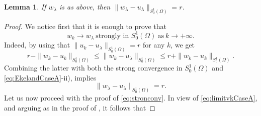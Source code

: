 \documentclass[11pt]{amsart}
\numberwithin{equation}{section} %
\newtheorem{lemma}[teo]{Lemma}
\theoremstyle{definition}
\newcommand{\m}{\mbox}
\begin{document}
\begin{lemma}\label{lem:casoa2}
	If $w_\lambda$ is as above,
	then $\|w_\lambda-u_\lambda\|_{S^{1}_{0}(\Omega)}=r$.
\end{lemma}
\begin{proof} 
We notice first that it is enough to prove that 
\begin{equation}\label{eq:stronconv}
	w_k\to w_\lambda\ \m{strongly in }S_0^1(\Omega)\ \m{as}\ k\to+\infty.
\end{equation}
Indeed, by using that $\|u_k-u_\lambda\|_{S^{1}_{0}(\Omega)}=r$ for any $k$,
we get
\[
r-\|w_k-u_k\|_{S^{1}_{0}(\Omega)} \leq \|w_k-u_\lambda\|_{S^{1}_{0}(\Omega)} \leq r+\|w_k-u_k\|_{S^{1}_{0}(\Omega)}.
\]
Combining the latter with both the strong convergence in $S_{0}^{1}(\Omega)$ and \eqref{eq:EkelandCaseA}-ii),
implies 
$$\|w_\lambda-u_\lambda\|_{S^{1}_{0}(\Omega)}=r.$$
Let us now proceed with the proof of \eqref{eq:stronconv}. 
In view of \eqref{eq:limitvkCaseA}, and arguing as in the proof of \cite[Lemma 4.3]{BiGaVe}, it follows that



\end{proof}
\end{document}
